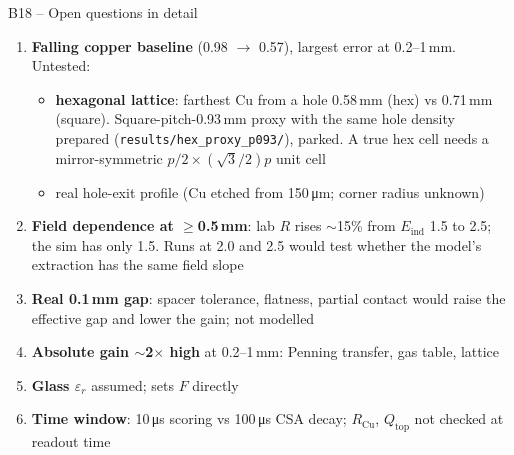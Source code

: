 \documentclass[aspectratio=169,11pt]{beamer}
\newcommand{\backlink}[1]{\hfill\hyperlink{#1}{\beamerreturnbutton{back}}}
\newcommand{\RCu}{R_\text{Cu}}
\newcommand{\Qtop}{Q_\text{top}}
\newcommand{\Eind}{E_\text{ind}}
\newcommand{\er}{\varepsilon_r}
\begin{document}
\begin{frame}[label=b-open]{B18 -- Open questions in detail}
  \small
  \begin{enumerate}
    \item \textbf{Falling copper baseline} (0.98 $\to$ 0.57), largest error at 0.2--1\,mm. Untested:
      \begin{itemize}
        \item \textbf{hexagonal lattice}: farthest Cu from a hole 0.58\,mm (hex) vs 0.71\,mm (square). Square-pitch-0.93\,mm proxy with the same hole density prepared (\texttt{results/hex\_proxy\_p093/}), parked. A true hex cell needs a mirror-symmetric $p/2\times(\sqrt3/2)p$ unit cell
        \item real hole-exit profile (Cu etched from 150\,\si{\micro m}; corner radius unknown)
      \end{itemize}
    \item \textbf{Field dependence at $\ge$0.5\,mm}: lab $R$ rises $\sim$15\% from $\Eind$ 1.5 to 2.5; the sim has only 1.5. Runs at 2.0 and 2.5 would test whether the model's extraction has the same field slope
    \item \textbf{Real 0.1\,mm gap}: spacer tolerance, flatness, partial contact would raise the effective gap and lower the gain; not modelled
    \item \textbf{Absolute gain $\sim$2$\times$ high} at 0.2--1\,mm: Penning transfer, gas table, lattice
    \item \textbf{Glass $\er$} assumed; sets $F$ directly
    \item \textbf{Time window}: 10\,\si{\micro s} scoring vs 100\,\si{\micro s} CSA decay; $\RCu$, $\Qtop$ not checked at readout time
  \end{enumerate}
  \backlink{m-next}
\end{frame}
\end{document}
